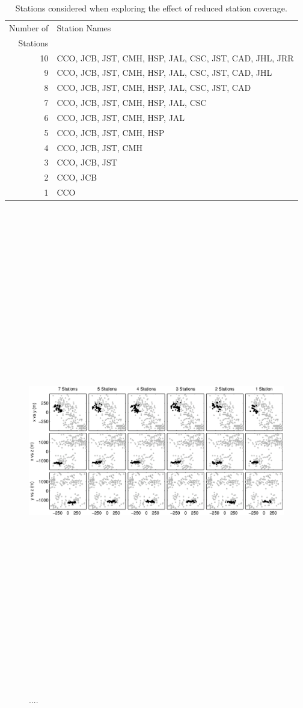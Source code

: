 \documentclass[extra]{gji}
\begin{document}
\begin{table}
\caption{Stations considered when exploring the effect of reduced station coverage.}
\label{tab:Calaveras-stationremoval}
\begin{tabular}{|r|l|}
\hline
Number of & Station Names\\
Stations  & \\
\hline
10 & CCO, JCB, JST, CMH, HSP, JAL, CSC, JST, CAD, JHL, JRR\\
9  & CCO, JCB, JST, CMH, HSP, JAL, CSC, JST, CAD, JHL\\
8  & CCO, JCB, JST, CMH, HSP, JAL, CSC, JST, CAD\\
7  & CCO, JCB, JST, CMH, HSP, JAL, CSC \\
6  & CCO, JCB, JST, CMH, HSP, JAL \\
5  & CCO, JCB, JST, CMH, HSP \\
4  & CCO, JCB, JST, CMH \\
3  & CCO, JCB, JST \\
2  & CCO, JCB \\
1  & CCO \\
\hline
\end{tabular}
\end{table}

\begin{figure}
\includegraphics[angle=90,height = 50pc]{diags/CalaverasLoc2.eps}
\caption{....}
\label{fig-CWIreducesstats}
\end{figure}


\end{document}
